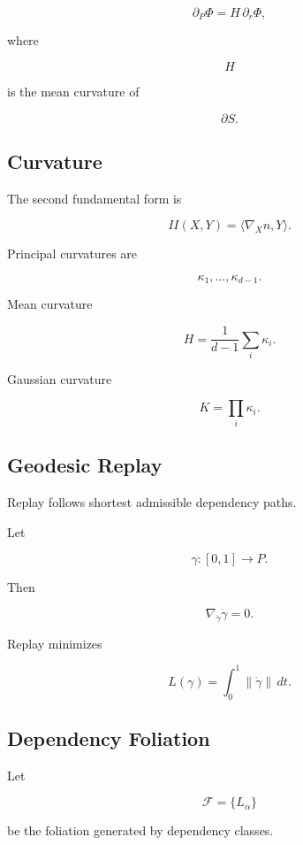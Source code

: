 \documentclass[12pt,oneside]{article}
\theoremstyle{definition}
\theoremstyle{remark}
\begin{document}
\[
\partial_P\Phi
=
H
\,
\partial_r\Phi,
\]

where

\[
H
\]

is the mean curvature of

\[
\partial S.
\]

\subsection*{Curvature}

The second fundamental form is

\[
II(X,Y)
=
\langle
\nabla_X n,
Y
\rangle.
\]

Principal curvatures are

\[
\kappa_1,
\ldots,
\kappa_{d-1}.
\]

Mean curvature

\[
H
=
\frac1{d-1}
\sum_i
\kappa_i.
\]

Gaussian curvature

\[
K
=
\prod_i
\kappa_i.
\]

\subsection*{Geodesic Replay}

Replay follows shortest admissible dependency paths.

Let

\[
\gamma
:
[0,1]
\rightarrow
P.
\]

Then

\[
\nabla_{\dot\gamma}
\dot\gamma
=
0.
\]

Replay minimizes

\[
L(\gamma)
=
\int_0^1
\|\dot\gamma\|
\,dt.
\]

\subsection*{Dependency Foliation}

Let

\[
\mathcal F
=
\{
L_\alpha
\}
\]

be the foliation generated by dependency classes.
\end{document}
